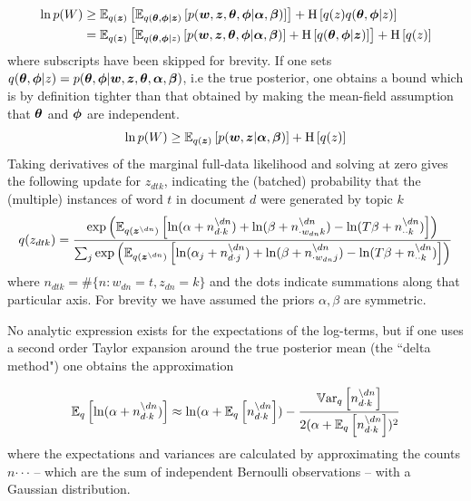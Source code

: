\begin{align}
\ln p(W) & \geq \ex{\ex{p(\vv{w},\vv{z},\vv{\theta},\vv{\phi}|\vv{\alpha},\vv{\beta})}{q(\vv{\theta},\vv{\phi}|\vv{z})}}{q(\vv{z})}
+\ent{q(z)q(\vv{\theta},\vv{\phi}|z)}\\
& = \ex{\ex{p(\vv{w},\vv{z},\vv{\theta},\vv{\phi}|\vv{\alpha},\vv{\beta})}{q(\vv{\theta},\vv{\phi}|z)} + \ent{q(\vv{\theta},\vv{\phi}|\vv{z})}}{q(\vv{z})}
+\ent{q(z)} 
\end{align}
where subscripts have been skipped for brevity. If one sets $q(\vv{\theta},\vv{\phi}|z) = p(\vv{\theta},\vv{\phi}|\vv{w},\vv{z},\vv{\theta},\vv{\alpha},\vv{\beta})$, i.e the true posterior, one obtains a bound which is by definition tighter than that obtained by making the mean-field assumption that $\vv{\theta}$ and $\vv{\phi}$ are independent. 
\begin{equation}
\ln p(W) \geq \ex{p(\vv{w},\vv{z}|\vv{\alpha},\vv{\beta})}{q(\vv{z})} + \ent{q(z)}
\end{equation}
Taking derivatives of the marginal full-data likelihood and solving at zero gives the following update for $z_{dtk}$, indicating the (batched) probability that the (multiple) instances of word $t$ in document $d$ were generated by topic $k$
{\small
\begin{align}
q(z_{dtk}) =
\frac{
    \exp\left(
        \ex{
            \ln(\alpha + n_{d\cdot k}^{\setminus dn})
            +\ln(\beta + n_{\cdot w_{dn} k}^{\setminus dn})
            -\ln(T \beta + n_{\cdot \cdot k}^{\setminus dn})
        }{q(\vv{z}^{\setminus dn})}
    \right)
} {
    \sum_j \exp \left(
        \ex{
            \ln(\alpha_j + n_{d\cdot j}^{\setminus dn})
            +\ln(\beta + n_{\cdot w_{dn} j}^{\setminus dn})
            -\ln(T \beta + n_{\cdot \cdot k}^{\setminus dn})
        }{q(\vv{z}^{\setminus dn})}
    \right)
}
\end{align}
}
where $n_{dtk} = \#\{n : w_{dn} = t, z_{dn} = k\}$ and the dots indicate summations along that particular axis. For brevity we have assumed the priors $\alpha, \beta$ are symmetric.

No analytic expression exists for the expectations of the log-terms, but if one uses a second order Taylor expansion around the true posterior mean (the ``delta method"\cite{Wang2013}) one obtains the approximation

\begin{align}
\ex{\ln(\alpha + n_{d\cdot k}^{\setminus dn})}{q}
\approx
\ln(\alpha + \ex{n_{d\cdot k}^{\setminus dn}}{q})
- \frac{
    \var{n_{d\cdot k}^{\setminus dn}}{q}
  } {
      2 (\alpha + \ex{n_{d\cdot k}^{\setminus dn}}{q})^2 
  }
\end{align}
where the expectations and variances are calculated by approximating the counts $n{\cdot \cdot \cdot}$ -- which are the sum of independent Bernoulli observations -- with a Gaussian distribution.

